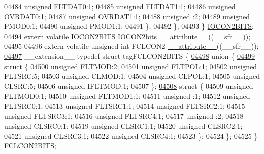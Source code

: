 \begin{DoxyCode}
04484       \textcolor{keywordtype}{unsigned} FLTDAT0:1;
04485       \textcolor{keywordtype}{unsigned} FLTDAT1:1;
04486       \textcolor{keywordtype}{unsigned} OVRDAT0:1;
04487       \textcolor{keywordtype}{unsigned} OVRDAT1:1;
04488       \textcolor{keywordtype}{unsigned} :2;
04489       \textcolor{keywordtype}{unsigned} PMOD0:1;
04490       \textcolor{keywordtype}{unsigned} PMOD1:1;
04491     \};
04492   \};
04493 \} \hyperlink{a00014_da/def/a00513}{IOCON2BITS};
04494 \textcolor{keyword}{extern} \textcolor{keyword}{volatile} \hyperlink{a00014_da/def/a00513}{IOCON2BITS} IOCON2bits \hyperlink{a00015_a493c46f03454991ccc5aa7a6e1dfb2a7}{\_\_attribute\_\_}((\_\_sfr\_\_));
04495 
04496 \textcolor{keyword}{extern} \textcolor{keyword}{volatile} \textcolor{keywordtype}{unsigned} \textcolor{keywordtype}{int}  FCLCON2 \hyperlink{a00015_a493c46f03454991ccc5aa7a6e1dfb2a7}{\_\_attribute\_\_}((\_\_sfr\_\_));
\hypertarget{a00015_source_l04497}{}\hyperlink{a00014}{04497} \_\_extension\_\_ \textcolor{keyword}{typedef} \textcolor{keyword}{struct }tagFCLCON2BITS \{
\hypertarget{a00015_source_l04498}{}\hyperlink{a00015}{04498}   \textcolor{keyword}{union }\{
\hypertarget{a00015_source_l04499}{}\hyperlink{a00015}{04499}     \textcolor{keyword}{struct }\{
04500       \textcolor{keywordtype}{unsigned} FLTMOD:2;
04501       \textcolor{keywordtype}{unsigned} FLTPOL:1;
04502       \textcolor{keywordtype}{unsigned} FLTSRC:5;
04503       \textcolor{keywordtype}{unsigned} CLMOD:1;
04504       \textcolor{keywordtype}{unsigned} CLPOL:1;
04505       \textcolor{keywordtype}{unsigned} CLSRC:5;
04506       \textcolor{keywordtype}{unsigned} IFLTMOD:1;
04507     \};
\hypertarget{a00015_source_l04508}{}\hyperlink{a00015}{04508}     \textcolor{keyword}{struct }\{
04509       \textcolor{keywordtype}{unsigned} FLTMOD0:1;
04510       \textcolor{keywordtype}{unsigned} FLTMOD1:1;
04511       \textcolor{keywordtype}{unsigned} :1;
04512       \textcolor{keywordtype}{unsigned} FLTSRC0:1;
04513       \textcolor{keywordtype}{unsigned} FLTSRC1:1;
04514       \textcolor{keywordtype}{unsigned} FLTSRC2:1;
04515       \textcolor{keywordtype}{unsigned} FLTSRC3:1;
04516       \textcolor{keywordtype}{unsigned} FLTSRC4:1;
04517       \textcolor{keywordtype}{unsigned} :2;
04518       \textcolor{keywordtype}{unsigned} CLSRC0:1;
04519       \textcolor{keywordtype}{unsigned} CLSRC1:1;
04520       \textcolor{keywordtype}{unsigned} CLSRC2:1;
04521       \textcolor{keywordtype}{unsigned} CLSRC3:1;
04522       \textcolor{keywordtype}{unsigned} CLSRC4:1;
04523     \};
04524   \};
04525 \} \hyperlink{a00014_d3/def/a00446}{FCLCON2BITS};

\end{DoxyCode}
